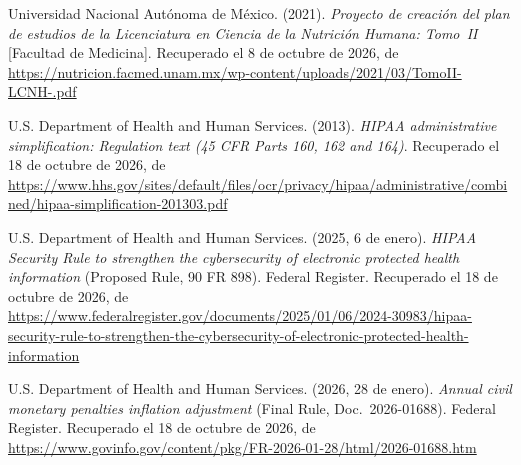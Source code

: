 \documentclass[12pt, a4paper]{article}
\begin{document}
\begin{list}{}{\setlength{\leftmargin}{1.27cm}\setlength{\itemindent}{-1.27cm}%
  \setlength{\labelwidth}{0pt}\setlength{\labelsep}{0pt}\setlength{\itemsep}{6pt}}
\item Universidad Nacional Autónoma de México. (2021). \textit{Proyecto de
  creación del plan de estudios de la Licenciatura en Ciencia de la
  Nutrición Humana: Tomo~II} [Facultad de Medicina].
  Recuperado el 8 de octubre de 2026, de \url{https://nutricion.facmed.unam.mx/wp-content/uploads/2021/03/TomoII-LCNH-.pdf}
 
 
\item U.S. Department of Health and Human Services. (2013).
  \textit{HIPAA administrative simplification: Regulation text
  (45 CFR Parts 160, 162 and 164)}. Recuperado el 18 de octubre de 2026, de \url{https://www.hhs.gov/sites/default/files/ocr/privacy/hipaa/administrative/combined/hipaa-simplification-201303.pdf}


\item U.S. Department of Health and Human Services. (2025,
  6 de enero). \textit{HIPAA Security Rule to strengthen the
  cybersecurity of electronic protected health information}
  (Proposed Rule, 90 FR 898). Federal Register. Recuperado el 18 de octubre de 2026, de \url{https://www.federalregister.gov/documents/2025/01/06/2024-30983/hipaa-security-rule-to-strengthen-the-cybersecurity-of-electronic-protected-health-information}


\item U.S. Department of Health and Human Services. (2026,
  28 de enero). \textit{Annual civil monetary penalties
  inflation adjustment} (Final Rule, Doc.~2026-01688). Federal
  Register.
  Recuperado el 18 de octubre de 2026, de \url{https://www.govinfo.gov/content/pkg/FR-2026-01-28/html/2026-01688.htm}
 

\end{list}
\end{document}
